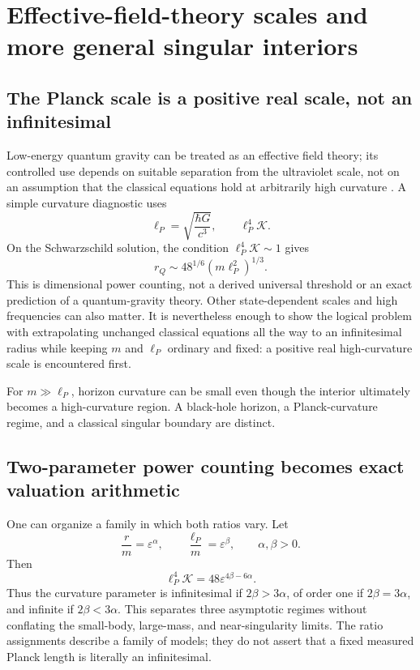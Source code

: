 \documentclass[11pt,a4paper]{article}
\numberwithin{equation}{section}
\theoremstyle{definition}
\theoremstyle{remark}
\newcommand{\Kret}{\mathcal K}
\begin{document}
\section{Effective-field-theory scales and more general singular interiors}\label{sec:eft}

\subsection{The Planck scale is a positive real scale, not an infinitesimal}
Low-energy quantum gravity can be treated as an effective field theory; its
controlled use depends on suitable separation from the ultraviolet scale, not
on an assumption that the classical equations hold at arbitrarily high
curvature \cite{Donoghue,DonoghueReview}. A simple curvature diagnostic uses
\[
\ell_P=\sqrt{\frac{\hbar G}{c^3}},
\qquad \ell_P^4\Kret.
\]
On the Schwarzschild solution, the condition $\ell_P^4\Kret\sim1$ gives
\begin{equation}\label{eq:rq}
r_Q\sim48^{1/6}(m\ell_P^2)^{1/3}.
\end{equation}
This is dimensional power counting, not a derived universal threshold or an
exact prediction of a quantum-gravity theory. Other state-dependent scales and
high frequencies can also matter. It is nevertheless enough to show the
logical problem with extrapolating unchanged classical equations all the way
to an infinitesimal radius while keeping $m$ and $\ell_P$ ordinary and fixed:
a positive real high-curvature scale is encountered first.

For $m\gg\ell_P$, horizon curvature can be small even though the interior
ultimately becomes a high-curvature region. A black-hole horizon, a
Planck-curvature regime, and a classical singular boundary are distinct.

\subsection{Two-parameter power counting becomes exact valuation arithmetic}
One can organize a family in which both ratios vary. Let
\[
\frac rm=\varepsilon^\alpha,
\qquad \frac{\ell_P}{m}=\varepsilon^\beta,
\qquad \alpha,\beta>0.
\]
Then
\begin{equation}\label{eq:EFTvaluation}
\ell_P^4\Kret=48\varepsilon^{4\beta-6\alpha}.
\end{equation}
Thus the curvature parameter is infinitesimal if $2\beta>3\alpha$, of order
one if $2\beta=3\alpha$, and infinite if $2\beta<3\alpha$. This separates
three asymptotic regimes without conflating the small-body, large-mass, and
near-singularity limits. The ratio assignments describe a family of models;
they do not assert that a fixed measured Planck length is literally an
infinitesimal.
\end{document}
